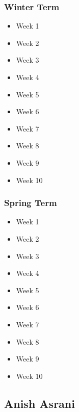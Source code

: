 	\subsubsection{Winter Term}
	\begin{itemize}
		\item{Week 1}
		\item{Week 2}
		\item{Week 3}
		\item{Week 4}
		\item{Week 5}
		\item{Week 6}
		\item{Week 7}
		\item{Week 8}
		\item{Week 9}
		\item{Week 10}
	\end{itemize}

	\subsubsection{Spring Term}
	\begin{itemize}
		\item{Week 1}
		\item{Week 2}
		\item{Week 3}
		\item{Week 4}
		\item{Week 5}
		\item{Week 6}
		\item{Week 7}
		\item{Week 8}
		\item{Week 9}
		\item{Week 10}
	\end{itemize}

	\pagebreak

	\subsection{Anish Asrani}
